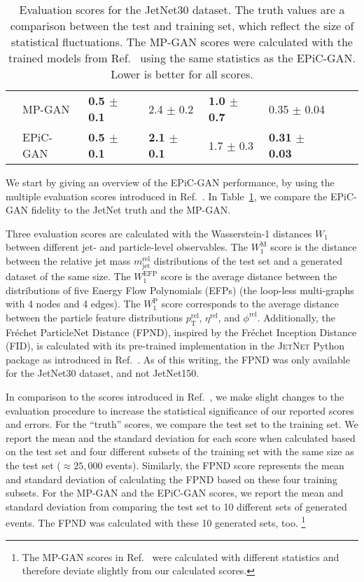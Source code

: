 \documentclass[a4paper,submission, Phys]{SciPost}
\DeclareRobustCommand{\Tab}[1]{Table~\ref{tab:#1}}
\DeclareRobustCommand{\Reff}[1]{Ref.~\cite{#1}}
\begin{document}
\begin{table}[tbp]
\begin{tabular}{clllllll}
&  MP-GAN         & \textbf{0.5 $\pm$ 0.1}    & 2.4 $\pm$ 0.2   & \textbf{1.0 $\pm$ 0.7}   & 0.35 $\pm$ 0.04               \\ %
&  EPiC-GAN       & \textbf{0.5 $\pm$ 0.1}    & \textbf{2.1 $\pm$ 0.1}   & 1.7 $\pm$ 0.3   & \textbf{0.31 $\pm$ 0.03} \\ %
\hline
\end{tabular}
\caption{
%
Evaluation scores for the JetNet30 dataset.
%
The truth values are a comparison between the test and training set, which reflect the size of statistical fluctuations.
%
The MP-GAN scores were calculated with the trained models from \Reff{MPGAN} using the same statistics as the EPiC-GAN.
%
Lower is better for all scores. }\label{tab:jetnet30_results}
\end{table}




We start by giving an overview of the EPiC-GAN performance, by using the multiple evaluation scores introduced in \Reff{MPGAN}.
%
In \Tab{jetnet30_results}, we compare the EPiC-GAN fidelity to the JetNet truth and the MP-GAN.


Three evaluation scores are calculated with the Wasserstein-1 distances $W_1$ between different jet- and particle-level observables. 
%
The $W_1^\mathrm{M}$ score is the distance between the relative jet mass $m_\mathrm{jet}^\mathrm{rel}$ distributions of the test set and a generated dataset of the same size. 
%
The $W_1^\mathrm{EFP}$ score is the average distance between the distributions of five Energy Flow Polynomials (EFPs) (the loop-less multi-graphs with 4 nodes and 4 edges).
%
The $W_1^\mathrm{P}$ score corresponds to the average distance between the particle feature distributions $p_\mathrm{T}^\mathrm{rel}$, $\eta^\mathrm{rel}$, and $\phi^\mathrm{rel}$. 
%
Additionally, the Fréchet ParticleNet Distance (FPND), inspired by the Fréchet Inception Distance (FID), is calculated with its pre-trained implementation in the \textsc{JetNet} Python package as introduced in \Reff{MPGAN}. 
%
As of this writing, the FPND was only available for the JetNet30 dataset, and not JetNet150.


In comparison to the scores introduced in \Reff{MPGAN},
we make slight changes to the evaluation procedure to increase the statistical significance of our reported scores and errors. 
%
For the ``truth'' scores, we compare the test set to the training set. 
%
We report the mean and the standard deviation for each score when calculated based on the test set and four different subsets of the training set with the same size as the test set ($\approx 25,000$ events). 
%
Similarly, the FPND score represents the mean and standard deviation of calculating the FPND based on these four training subsets. 
%
For the MP-GAN and the EPiC-GAN scores, we report the mean and standard deviation from comparing the test set to 10 different sets of generated events. 
%
The FPND was calculated with these 10 generated sets, too.%
%
\footnote{The MP-GAN scores in \Reff{MPGAN} were calculated with different statistics and therefore deviate slightly from our calculated scores.}
\end{document}
